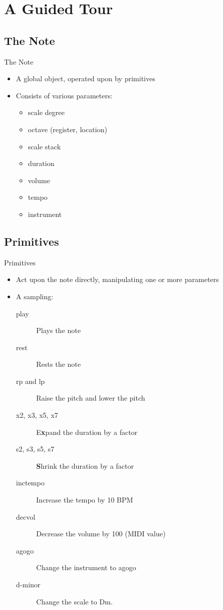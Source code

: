 \documentclass[12pt]{beamer}
\begin{document}
\section{A Guided Tour}
\subsection{The Note}
\begin{frame}{The Note}
  \begin{itemize}
    \item A global object, operated upon by primitives
    \item Consists of various parameters:
    \begin{itemize}
      \item scale degree
      \item octave (register, location)
      \item scale stack
      \item duration
      \item volume
      \item tempo
      \item instrument
    \end{itemize}
  \end{itemize}
\end{frame}

\subsection{Primitives}
\begin{frame}{Primitives}
  \begin{itemize}
    \item Act upon the note directly, manipulating one or more parameters
    \item A sampling:
    \begin{description}
      \item[play] Plays the note
      \item[rest] Rests the note
      \item[rp and lp] Raise the pitch and lower the pitch
      \item[x2, x3, x5, x7] E\textbf{x}pand the duration by a factor
      \item[s2, s3, s5, s7] \textbf{S}hrink the duration by a factor
      \item[inctempo] Increase the tempo by 10 BPM
      \item[decvol] Decrease the volume by 100 (MIDI value)
      \item[agogo] Change the instrument to agogo
      \item[d-minor] Change the scale to Dm.
    \end{description}
  \end{itemize}
\end{frame}
\end{document}
